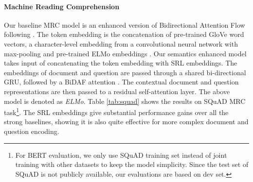 \documentclass[11pt]{article}
\begin{document}
\paragraph{Machine Reading Comprehension}

Our baseline MRC model is an enhanced version of Bidirectional Attention Flow \citep{Seo2016Bidirectional} following \citep{clark2018simple}. The token embedding is the concatenation of pre-trained GloVe word vectors, a character-level embedding from a convolutional neural network with max-pooling and pre-trained ELMo embeddings \citep{Peters2018ELMO}. Our semantics enhanced model takes input of concatenating the token embedding with SRL embeddings. The embeddings of document and question are passed through a shared bi-directional GRU, followed by a BiDAF attention \citep{Seo2016Bidirectional}. The contextual document and question representations are then passed to a residual self-attention layer. The above model is denoted as \emph{ELMo}. 
Table \ref{tab:squad} shows the results on SQuAD MRC task\footnote{For BERT evaluation, we only use SQuAD training set instead of joint training with other datasets to keep the model simplicity. Since the test set of SQuAD is not publicly available, our evaluations are based on dev set.}. The SRL embeddings give substantial performance gains over all the strong baselines, showing it is also quite effective for more complex document and question encoding.
\end{document}
